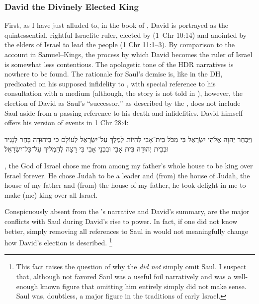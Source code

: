 \subsubsection{David the Divinely Elected King}
First, as I have just alluded to, in the book of \chronicles, David is portrayed as the quintessential, rightful Israelite ruler, elected by \yahweh (1~Chr 10:14) and anointed by the elders of Israel to lead the people (1 Chr 11:1--3). By comparison to the account in Samuel--Kings, the process by which David becomes the ruler of Israel is somewhat less contentious. The apologetic tone of the HDR narratives is nowhere to be found. The rationale for Saul's demise is, like in the DH, predicated on his supposed infidelity to \yahweh, with special reference to his consultation with a medium (although, the story is not told in \chronicles), however, the election of David as Saul's ``successor,'' as described by the \chronicler, does not include Saul aside from a passing reference to his death and infidelities. David himself offers his version of events in 1 Chr 28:4:
\begin{hebrewtext}
    וַיִּבְחַר יְהוָה אֱלֹהֵי יִשְׂרָאֵל בִּי מִכֹּל בֵּית־אָבִי לִהְיוֹת לְמֶלֶךְ עַל־יִשְׂרָאֵל לְעוֹלָם כִּי בִיהוּדָה בָּחַר לְנָגִיד וּבְבֵית יְהוּדָה בֵּית אָבִי וּבִבְנֵי אָבִי בִּי רָצָה לְהַמְלִיךְ עַל־כָּל־יִשְׂרָאֵל׃ 
\end{hebrewtext}
\begin{translation}
    \yahweh, the God of Israel chose me from among my father's whole house to be king over Israel forever. He chose Judah to be a leader and (from) the house of Judah, the house of my father and (from) the house of my father, he took delight in me to make (me) king over all Israel.
\end{translation}
Conspicuously absent from the \chronicler's narrative and David's summary, are the major conflicts with Saul during David's rise to power. In fact, if one did not know better, simply removing all references to Saul in \chronicles would not meaningfully change how David's election is described.%
    \footnote{This fact raises the question of why the \chronicler \emph{did not} simply omit Saul. I suspect that, although not favored Saul was a useful foil narratively and was a well-enough known figure that omitting him entirely simply did not make sense. Saul was, doubtless, a major figure in the traditions of early Israel.}

